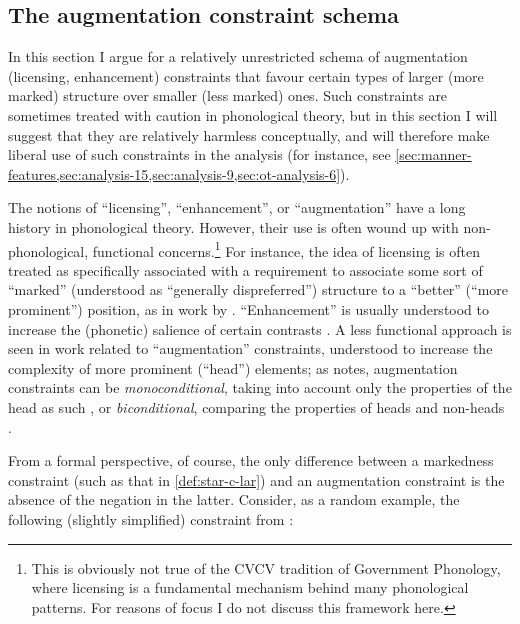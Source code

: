 \subsection{The augmentation constraint schema}
\label{sec:licens-enhanc-schema}

In this section I argue for a relatively unrestricted schema of augmentation (licensing,  enhancement) constraints that favour certain types of larger (more marked) structure over smaller (less marked) ones. Such constraints are sometimes treated with caution in phonological theory, but in this section I will suggest that they are relatively harmless conceptually, and will therefore make liberal use of such constraints in the analysis (for instance, see \cref{sec:manner-features,sec:analysis-15,sec:analysis-9,sec:ot-analysis-6}).

The notions of \enquote{licensing}, \enquote{enhancement}, or \enquote{augmentation} have a long history in phonological theory. However, their use is often wound up with non\hyp phonological, functional concerns.\footnote{This is obviously not true of the CVCV tradition of Government Phonology, where licensing is a fundamental mechanism behind many phonological patterns. For reasons of focus I do not discuss this framework here.} For instance, the idea of licensing is often treated as specifically associated with a requirement to associate some sort of \enquote{marked} (understood as \enquote{generally dispreferred}) structure to a \enquote{better} (\ie \enquote{more prominent}) position, as in work by \citet{zoll1998,walker2000,walker05:_weak_trigg_vowel_harmon,walker11:_vowel}. \enquote{Enhancement} is usually understood to increase the (phonetic) salience of certain contrasts \citep{stevens89:_primar_featur_their_enhan_conson,stevens10:_quant,keyser06:_enhan_overl_speec_chain,avery01:_laryn,hall11:_phonol}. A less functional approach is seen in work related to \enquote{augmentation} constraints, understood to increase the complexity of more prominent (\enquote{head}) elements; as \citet{teeple09:_bicon} notes, augmentation constraints can be \emph{monoconditional}, taking into account only the properties of the head as such \citep[\egm][]{smith-diss}, or \emph{biconditional}, comparing the properties of heads and non\hyp heads \citep{dresher-vdhulst,teeple09:_bicon}.

From a formal perspective, of course, the only difference between a markedness constraint (such as that in \cref{def:star-c-lar}) and an augmentation constraint is the absence of the negation in the latter. Consider, as a random example, the following (slightly simplified) constraint from \citet{walker05:_weak_trigg_vowel_harmon}:

